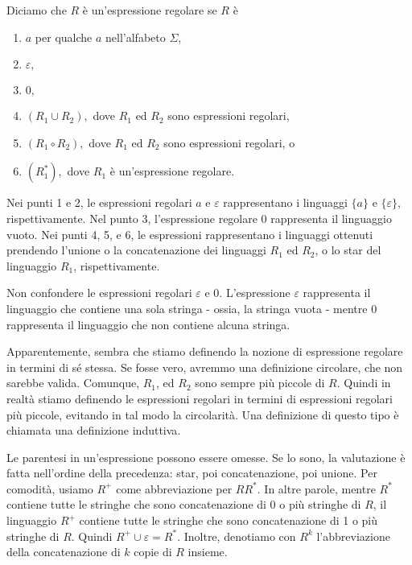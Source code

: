 \documentclass{article}
\begin{document}
\begin{tcolorbox}[colback=blue!10!white, colframe=blue!50!black, title=Definizione]
    Diciamo che $R$ è un'\textcolor{myred}{espressione regolare} se $R$ è
    \begin{enumerate}
        \item $a$ per qualche $a$ nell'alfabeto $\Sigma$,
        \item $\varepsilon,$
        \item $0,$
        \item $(R_{1}\cup R_{2}),$ dove $R_{1}$ ed $R_{2}$ sono espressioni regolari,
        \item $(R_{1}\circ R_{2}),$ dove $R_{1}$ ed $R_{2}$ sono espressioni regolari, o
        \item $(R^*_{1}),$ dove $R_{1}$ è un'espressione regolare.
    \end{enumerate}

    Nei punti 1 e 2, le espressioni regolari $a$ e $\varepsilon$ rappresentano i linguaggi $\{a\}$ e $\{\varepsilon\},$ rispettivamente. Nel punto 3, l'espressione regolare $0$ rappresenta il linguaggio vuoto. Nei punti 4, 5, e 6, le espressioni rappresentano i linguaggi ottenuti prendendo l'unione o la concatenazione dei linguaggi $R_{1}$ ed $R_{2}$, o lo star del linguaggio $R_1$, rispettivamente.
\end{tcolorbox}

\begin{tcolorbox}[colback=red!10!white, colframe=red!50!black, title=ATTENZIONE!]
    Non confondere le espressioni regolari $\varepsilon \text{ e } 0.$ L'espressione $\varepsilon$ rappresenta il linguaggio che contiene una sola stringa - ossia, la stringa vuota - mentre $0$ rappresenta il linguaggio che non contiene alcuna stringa.
\end{tcolorbox}

Apparentemente, sembra che stiamo definendo la nozione di espressione regolare in termini di sé stessa. Se fosse vero, avremmo una definizione circolare, che non sarebbe valida. Comunque, $R_{1}$, ed $R_{2}$ sono sempre più piccole di $R$. Quindi in realtà stiamo definendo le espressioni regolari in termini di espressioni regolari più piccole, evitando in tal modo la circolarità. Una definizione di questo tipo è chiamata una \textcolor{myred}{definizione induttiva}.
\vspace{1em}

Le parentesi in un'espressione possono essere omesse. Se lo sono, la valutazione è fatta nell'ordine della precedenza: star, poi concatenazione, poi unione.
Per comodità, usiamo $R^{+}$ come abbreviazione per $RR^{*}$. In altre parole, mentre $R^{*}$ contiene tutte le stringhe che sono concatenazione di 0 o più stringhe di $R$, il linguaggio $R^{+}$ contiene tutte le stringhe che sono concatenazione di 1 o più stringhe di $R$. Quindi $R^{+}\cup \varepsilon = R^{*}$. Inoltre, denotiamo con $R^{k}$ l'abbreviazione della concatenazione di $k$ copie di $R$ insieme.
\end{document}

